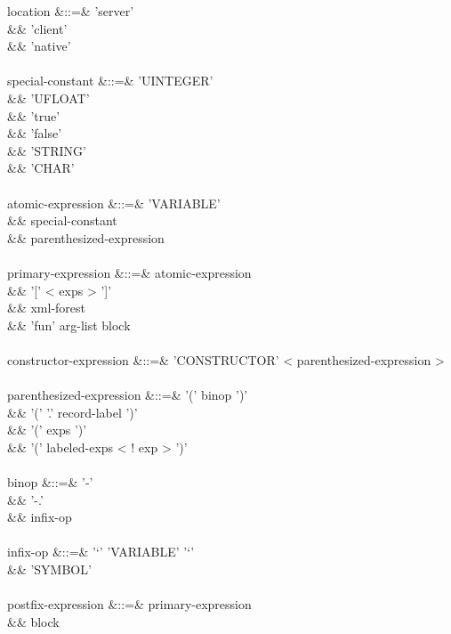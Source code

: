 \documentclass[11pt,a4paper]{article}
\begin{document}
\begin{grammar}
location &::=& 'server' \\
&&             'client' \\
&&             'native' \\
\\
special-constant &::=& 'UINTEGER' \\
&&                     'UFLOAT' \\
&&                     'true' \\
&&                     'false' \\
&&                     'STRING' \\
&&                     'CHAR' \\
\\
atomic-expression &::=& 'VARIABLE' \\
&&                      special-constant \\
&&                      parenthesized-expression \\
\\
primary-expression &::=& atomic-expression \\
&&                       '[' < exps > ']' \\
&&                       xml-forest \\
&&                       'fun' arg-list block \\
\\
constructor-expression &::=& 'CONSTRUCTOR' < parenthesized-expression > \\
\\
parenthesized-expression &::=&  '(' binop ')' \\
&&                              '(' '.' record-label ')' \\
&&                              '(' exps ')' \\
&&                              '(' labeled-exps < ! exp > ')' \\
\\
binop &::=& '-' \\
&&          '-.' \\
&&          infix-op \\
\\
infix-op &::=&  '`' 'VARIABLE' '`' \\
&&              'SYMBOL' \\
\\
postfix-expression &::=&  primary-expression \\
&&                        block \\

\end{grammar}
\end{document}
